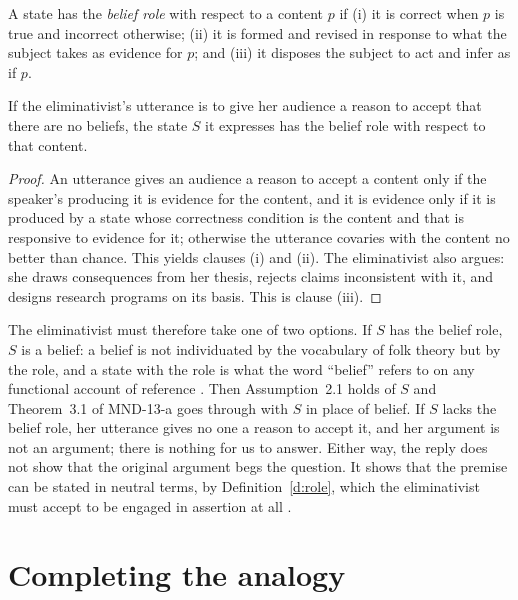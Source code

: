 \documentclass{situationist-preprint}
\begin{document}
\begin{definition}\label{d:role}
A state has the \emph{belief role} with respect to a content $p$ if (i) it is correct when $p$ is true and incorrect otherwise; (ii) it is formed and revised in response to what the subject takes as evidence for $p$; and (iii) it disposes the subject to act and infer as if $p$.
\end{definition}

\begin{proposition}\label{p:dilemma}
If the eliminativist's utterance is to give her audience a reason to accept that there are no beliefs, the state $S$ it expresses has the belief role with respect to that content.
\end{proposition}

\begin{proof}
An utterance gives an audience a reason to accept a content only if the speaker's producing it is evidence for the content, and it is evidence only if it is produced by a state whose correctness condition is the content and that is responsive to evidence for it; otherwise the utterance covaries with the content no better than chance. This yields clauses (i) and (ii). The eliminativist also argues: she draws consequences from her thesis, rejects claims inconsistent with it, and designs research programs on its basis. This is clause (iii).
\end{proof}

The eliminativist must therefore take one of two options. If $S$ has the belief role, $S$ is a belief: a belief is not individuated by the vocabulary of folk theory but by the role, and a state with the role is what the word \enquote{belief} refers to on any functional account of reference \citep{Boghossian1990}. Then Assumption~2.1 holds of $S$ and Theorem~3.1 of MND-13-a goes through with $S$ in place of belief. If $S$ lacks the belief role, her utterance gives no one a reason to accept it, and her argument is not an argument; there is nothing for us to answer. Either way, the reply does not show that the original argument begs the question. It shows that the premise can be stated in neutral terms, by Definition~\ref{d:role}, which the eliminativist must accept to be engaged in assertion at all \citep{Baker1987}.

\section{Completing the analogy}
\end{document}
